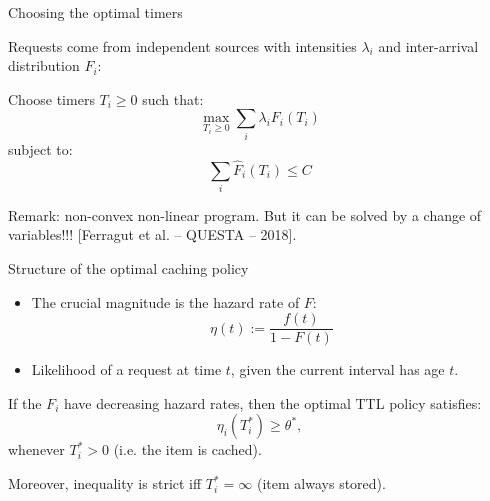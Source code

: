 \documentclass[aspectratio=169]{beamer}
\begin{document}
\begin{frame}{Choosing the optimal timers}

	Requests come from independent sources with intensities $\lambda_i$ and inter-arrival distribution $F_i$:

	\vfill

	\begin{problem}
		Choose timers $T_i\geqslant 0$ such that:
		\begin{equation*}
			\max_{T_i\geqslant 0} \sum_i \lambda_i F_i (T_i)
		\end{equation*}
		subject to:
		\begin{equation*}
			\sum_i \hat{F}_i(T_i) \leqslant C
		\end{equation*}
	\end{problem}

	\vfill
	\alert{Remark:} non-convex non-linear program. But it can be solved by a change of variables!!! [Ferragut et al. -- QUESTA -- 2018].
\end{frame}

\begin{frame}{Structure of the optimal caching policy}

	\begin{itemize}
 	\item The crucial magnitude is the \alert{hazard rate} of $F$:
	\begin{equation*}
		\eta(t) := \frac{f(t)}{1-F(t)}
	\end{equation*}
	\item Likelihood of a request at time $t$, given the current interval has age $t$.
	\end{itemize}
	\pause

	\vfill

	\begin{theorem}

		If the $F_i$ have \alert{decreasing hazard rates}, then the optimal TTL policy satisfies:
			\begin{equation*}
				\eta_i (T_i^*) \geqslant \theta^*,
			   \end{equation*}
		whenever $T_i^*>0$ (i.e. the item is cached).
		
		Moreover, inequality is strict iff $T_i^*=\infty$ (item always stored).	  
	\end{theorem}

\end{frame}
\end{document}
